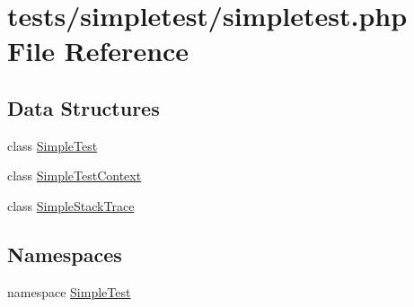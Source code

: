 \hypertarget{simpletest_8php}{\section{tests/simpletest/simpletest.php File Reference}
\label{simpletest_8php}
}
\subsection*{Data Structures}
\begin{DoxyCompactItemize}
\item 
class \hyperlink{class_simple_test}{Simple\-Test}
\item 
class \hyperlink{class_simple_test_context}{Simple\-Test\-Context}
\item 
class \hyperlink{class_simple_stack_trace}{Simple\-Stack\-Trace}
\end{DoxyCompactItemize}
\subsection*{Namespaces}
\begin{DoxyCompactItemize}
\item 
namespace \hyperlink{namespace_simple_test}{Simple\-Test}
\end{DoxyCompactItemize}
